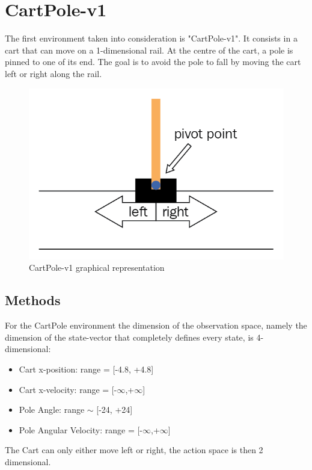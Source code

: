 \documentclass[11pt,a4paper,twocolumn]{IEEEtran}
\begin{document}
	\section{\textbf{CartPole-v1}}
		The first environment taken into consideration is "CartPole-v1". It consists in a cart that can move on a 1-dimensional rail. At the centre of the cart, a pole is pinned to one of its end. The goal is to avoid the pole to fall by moving the cart left or right along the rail.
		\begin{figure}[h]
			\centering
			\includegraphics[width=0.75\linewidth]{../imgs/cartpole}
			\caption{CartPole-v1 graphical representation}
		\end{figure}
		\subsection{\textbf{Methods}}
		For the CartPole environment the dimension of the observation space, namely the dimension of the state-vector that completely defines every state, is 4-dimensional\cite{GHCP}:
		\begin{itemize}
			\item Cart x-position: range = [-4.8, +4.8]
			\item Cart x-velocity: range = [-$\infty$,+$\infty$]
			\item Pole Angle: range $\sim$ [-24\textdegree , +24\textdegree]
			\item Pole Angular Velocity: range = [-$\infty$,+$\infty$]
		\end{itemize}
		The Cart can only either move left or right, the action space is then 2 dimensional.\medskip\\
		
\end{document}
